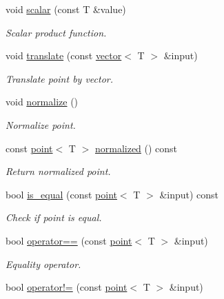 \begin{DoxyCompactItemize}
void \hyperlink{classddd_1_1point_ac913d28476f33d1cc300d281d625e0f3}{scalar} (const T \&value)
\begin{DoxyCompactList}\small\item\em Scalar product function. \end{DoxyCompactList}\item 
void \hyperlink{classddd_1_1point_a36c06fef72376a058c663dd9632ddcd0}{translate} (const \hyperlink{classddd_1_1vector}{vector}$<$ T $>$ \&input)
\begin{DoxyCompactList}\small\item\em Translate point by vector. \end{DoxyCompactList}\item 
\mbox{\label{classddd_1_1point_ab1d35fc412c7e2f1661cb34f1cc2c250}} 
void \hyperlink{classddd_1_1point_ab1d35fc412c7e2f1661cb34f1cc2c250}{normalize} ()
\begin{DoxyCompactList}\small\item\em Normalize point. \end{DoxyCompactList}\item 
\mbox{\label{classddd_1_1point_ac17331c629f79d5abd4b48d807967470}} 
const \hyperlink{classddd_1_1point}{point}$<$ T $>$ \hyperlink{classddd_1_1point_ac17331c629f79d5abd4b48d807967470}{normalized} () const
\begin{DoxyCompactList}\small\item\em Return normalized point. \end{DoxyCompactList}\item 
bool \hyperlink{classddd_1_1point_aa4cdbbf16736ee09e840e33f77e94b8a}{is\+\_\+equal} (const \hyperlink{classddd_1_1point}{point}$<$ T $>$ \&input) const
\begin{DoxyCompactList}\small\item\em Check if point is equal. \end{DoxyCompactList}\item 
bool \hyperlink{classddd_1_1point_a98f8e8097257f053b85e1ee32352fda4}{operator==} (const \hyperlink{classddd_1_1point}{point}$<$ T $>$ \&input)
\begin{DoxyCompactList}\small\item\em Equality operator. \end{DoxyCompactList}\item 
bool \hyperlink{classddd_1_1point_a2567b8c3cd08d965e70033f3f4a8d3db}{operator!=} (const \hyperlink{classddd_1_1point}{point}$<$ T $>$ \&input)

\end{DoxyCompactItemize}
